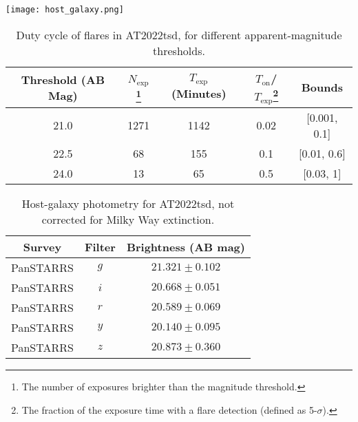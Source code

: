 \documentclass{nature_plusfigure}
\newcommand{\at}{AT2022tsd}
\newcommand{\arcsec}{$^{\prime\prime}$}
\begin{document}
\begin{extended_data}
\begin{figure*}[!ht]
    \centering
    \texttt{[image: host\_galaxy.png]}
    \caption{\emph{Left:} The position of \at\ within its host galaxy ($r$-band image from Pan-STARRS). The transient is $\approx1.4$\arcsec\ from the center of the galaxy, which corresponds to $9\,$kpc at the redshift of the galaxy. \emph{Right:} The host galaxy of \at\ in the mass-SFR diagram for transient host galaxies\cite{Taggart2021}, including core-collapse supernovae\cite{Taggart2021}, long-duration $\gamma$-ray bursts\cite{Taggart2021}, and LFBOTs\cite{Perley2019,Ho2020_Koala,Coppejans2020,Perley2021,Yao2022}. }
    \label{fig:host-galaxy}
\end{figure*}

\begin{table}
\begin{center}
\caption{Duty cycle of flares in \at, for different apparent-magnitude thresholds.}
\label{tab:flare-stats}
\begin{tabular}{ccccc} 
\hline\hline
Threshold (AB Mag) & $N_\mathrm{exp}$\footnote{The number of exposures brighter than the magnitude threshold.} & $T_\mathrm{exp}$ (Minutes) & $T_\mathrm{on}$/$T_\mathrm{exp}$\footnote{The fraction of the exposure time with a flare detection (defined as 5-$\sigma$).} & Bounds \\
\hline
21.0 & 1271 & 1142 & 0.02 & [0.001, 0.1] \\
22.5 & 68 & 155 & 0.1 & [0.01, 0.6]  \\
24.0 & 13 & 65 & 0.5 & [0.03, 1] \\
\hline
\end{tabular}
\end{center}
\end{table}

\begin{table}
\begin{center}
\caption{Host-galaxy photometry for \at, not corrected for Milky Way extinction.}
\label{tab:host-photometry}
\begin{tabular}{ccc} 
\hline\hline
Survey & Filter & Brightness (AB mag) \\
\hline
PanSTARRS & $g$               &$ 21.321 \pm 0.102 $\\
PanSTARRS & $i$               &$ 20.668 \pm 0.051 $\\
PanSTARRS & $r$               &$ 20.589 \pm 0.069 $\\
PanSTARRS & $y$               &$ 20.140 \pm 0.095 $\\
PanSTARRS& $z$               &$ 20.873 \pm 0.360 $\\
\hline
\end{tabular}
\end{center}
\end{table}


\end{extended_data}
\end{document}
